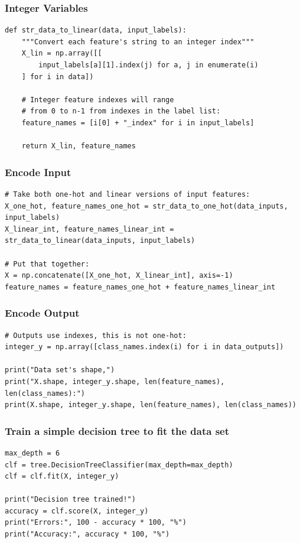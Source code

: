 \begin{frame}[fragile]\frametitle{Integer Variables}
\begin{lstlisting}
def str_data_to_linear(data, input_labels):
    """Convert each feature's string to an integer index"""
    X_lin = np.array([[
        input_labels[a][1].index(j) for a, j in enumerate(i)
    ] for i in data])
    
    # Integer feature indexes will range
    # from 0 to n-1 from indexes in the label list:
    feature_names = [i[0] + "_index" for i in input_labels]
    
    return X_lin, feature_names
\end{lstlisting}
\end{frame}


\begin{frame}[fragile]\frametitle{Encode Input}
\begin{lstlisting}
# Take both one-hot and linear versions of input features: 
X_one_hot, feature_names_one_hot = str_data_to_one_hot(data_inputs, input_labels)
X_linear_int, feature_names_linear_int = str_data_to_linear(data_inputs, input_labels)

# Put that together:
X = np.concatenate([X_one_hot, X_linear_int], axis=-1)
feature_names = feature_names_one_hot + feature_names_linear_int
\end{lstlisting}
\end{frame}


\begin{frame}[fragile]\frametitle{Encode Output}
\begin{lstlisting}
# Outputs use indexes, this is not one-hot:
integer_y = np.array([class_names.index(i) for i in data_outputs])

print("Data set's shape,")
print("X.shape, integer_y.shape, len(feature_names), len(class_names):")
print(X.shape, integer_y.shape, len(feature_names), len(class_names))
\end{lstlisting}
\end{frame}

\begin{frame}[fragile]\frametitle{Train a simple decision tree to fit the data set}
\begin{lstlisting}
max_depth = 6
clf = tree.DecisionTreeClassifier(max_depth=max_depth)
clf = clf.fit(X, integer_y)

print("Decision tree trained!")
accuracy = clf.score(X, integer_y)
print("Errors:", 100 - accuracy * 100, "%")
print("Accuracy:", accuracy * 100, "%")
\end{lstlisting}
\end{frame}

